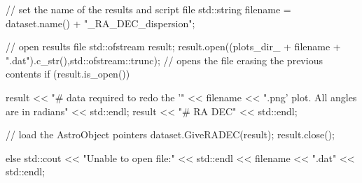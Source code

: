 \begin{DoxyCode}
                                                                               
            {
    // set the name of the results and script file
    std::string filename =  dataset.name() + "_RA_DEC_dispersion";
    
    // open results file
    std::ofstream result;
    result.open((plots_dir_ + filename + ".dat").c_str(),std::ofstream::trunc);
       // opens the file erasing the previous contents
    if (result.is_open()){
        
        result << "# data required to redo the '" << filename << ".png' plot.
       All angles are in radians" << std::endl;
        result << "# RA DEC" << std::endl;
        
        // load the AstroObject pointers
        dataset.GiveRADEC(result);                
        result.close();
    }
    else{
        std::cout << "Unable to open file:" << std::endl << filename << ".dat" 
      << std::endl;
    }
    
}
\end{DoxyCode}
